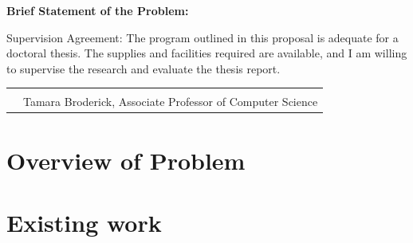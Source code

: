 \documentclass{article}
\begin{document}
\vspace{0.5cm}

{\bf \sc Brief Statement of the Problem:}

\abstract


\vspace{0.8cm}

Supervision Agreement:
The program outlined in this proposal is adequate for a doctoral thesis. The supplies and facilities
required are available, and I am willing to supervise the research and evaluate the thesis report.

\vspace{.5cm}

  \begin{tabular}{@{}p{.5in}p{4in}@{}}
 & \hrulefill \\
& \quad\quad\quad Tamara Broderick, Associate Professor of Computer Science
  \end{tabular}






  \newpage

\section{Overview of Problem}




\section{Existing work}






%

%

%
\end{document}
